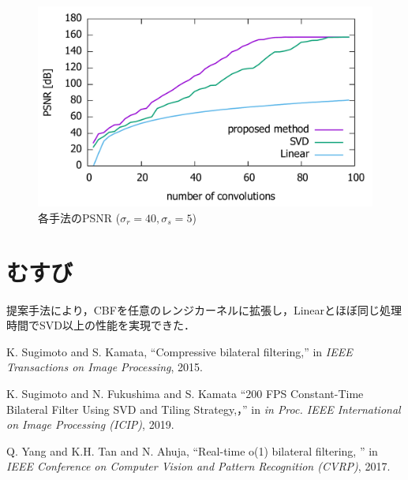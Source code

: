 \documentclass[twocolumn, a4paper]{./ieicejsp_tokai}
\begin{document}
\begin{figure}[H]
 \begin{center}
  \includegraphics[scale = 0.22]{fig/6-gauss_PSNR.pdf}
  \caption{各手法のPSNR ($\sigma_r=40, \sigma_s=5$)}
  \label{PSNR}
 \end{center}
\end{figure}
%
\section{むすび}
提案手法により，CBFを任意のレンジカーネルに拡張し，Linearとほぼ同じ処理時間でSVD以上の性能を実現できた．
{\small
\begin{thebibliography}{9}
\baselineskip=9.5pt
K. Sugimoto and S. Kamata, ``Compressive bilateral filtering,'' in \emph{IEEE Transactions on Image Processing}, 2015.

K. Sugimoto and N. Fukushima and S. Kamata ``200 FPS Constant-Time Bilateral Filter Using SVD and Tiling Strategy,，'' in \emph{in Proc. IEEE International on Image Processing (ICIP)}, 2019.

Q. Yang and K.H. Tan and N. Ahuja, ``Real-time o(1) bilateral filtering, '' in \emph{IEEE Conference on Computer Vision and Pattern Recognition (CVRP)}, 2017.
\end{thebibliography}
}
\end{document}
